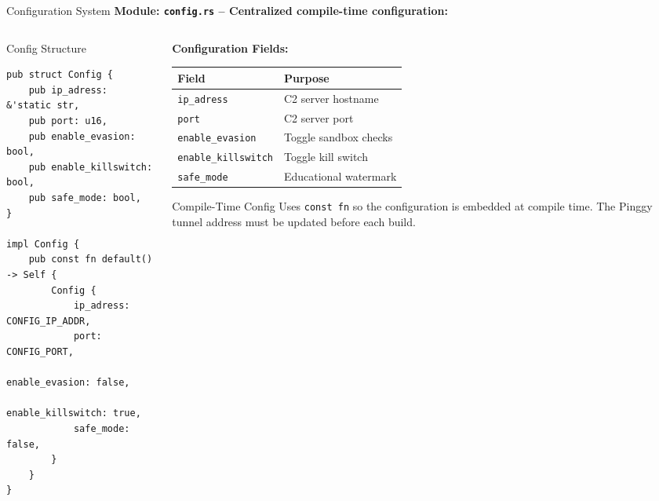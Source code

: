 \documentclass[aspectratio=169]{beamer}
\newcommand{\code}[1]{\texttt{\textcolor{primaryblue}{#1}}}
\begin{document}
\begin{frame}[fragile]{Configuration System}
  \textbf{Module: \code{config.rs} -- Centralized compile-time configuration:}

  \vspace{0.5em}
  \begin{columns}[T]
    \begin{column}{0.55\textwidth}
      \begin{codebox}{Config Structure}
        \begin{lstlisting}[style=ruststyle]
pub struct Config {
    pub ip_adress: &'static str,
    pub port: u16,
    pub enable_evasion: bool,
    pub enable_killswitch: bool,
    pub safe_mode: bool,
}

impl Config {
    pub const fn default() -> Self {
        Config {
            ip_adress: CONFIG_IP_ADDR,
            port: CONFIG_PORT,
            enable_evasion: false,
            enable_killswitch: true,
            safe_mode: false,
        }
    }
}
        \end{lstlisting}
      \end{codebox}
    \end{column}
    \begin{column}{0.42\textwidth}
      \textbf{Configuration Fields:}

      \vspace{0.5em}
      \footnotesize
      \begin{tabular}{ll}
        \toprule
        \textbf{Field} & \textbf{Purpose} \\
        \midrule
        \code{ip\_adress} & C2 server hostname \\
        \code{port} & C2 server port \\
        \code{enable\_evasion} & Toggle sandbox checks \\
        \code{enable\_killswitch} & Toggle kill switch \\
        \code{safe\_mode} & Educational watermark \\
        \bottomrule
      \end{tabular}

      \vspace{0.5em}
      \begin{infobox}{Compile-Time Config}
        Uses \code{const fn} so the configuration is embedded at compile time. The Pinggy tunnel address must be updated before each build.
      \end{infobox}
    \end{column}
  \end{columns}
\end{frame}
\end{document}
